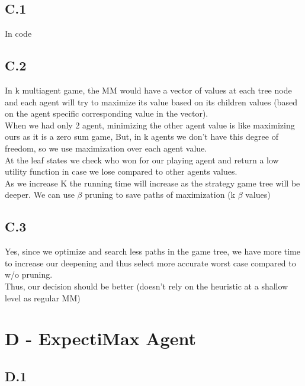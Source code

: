 \documentclass[12pt]{article}
\begin{document}
\subsection*{C.1}
In code 

\subsection*{C.2}
In k multiagent game, the MM would have a vector of values at each tree node and each agent will try to maximize its value based on its children values (based on the agent specific corresponding value in the vector).\\
When we had only 2 agent, minimizing the other agent value is like maximizing ours as it is a zero sum game, But, in k agents we don't have this degree of freedom, so we use maximization over each agent value.\\
At the leaf states we check who won for our playing agent and return a low utility function in case we lose compared to other agents values.\\
As we increase K the running time will increase as the strategy game tree  will be deeper. We can use $\beta$ pruning to save paths of maximization (k $\beta$ values)\\

\begin{comment}
The average branching factor (in the ideal case in which we prune all with ideal children ordering) $b'$ will be $\sqrt[k]{b}$ as the recursion formula (as seen on lecture) for the K case is:
$$T(d)= T(d-1) + (b-1)T(d-(k+1))$$
\end{comment}

\subsection*{C.3}
Yes, since we optimize and search less paths in the game tree, we have more time to increase our deepening and thus select more accurate worst case compared to w/o pruning.\\
Thus, our decision should be better (doesn't rely on the heuristic at a shallow level as regular MM)\\

\section*{D - ExpectiMax Agent}

\subsection*{D.1}
\end{document}
